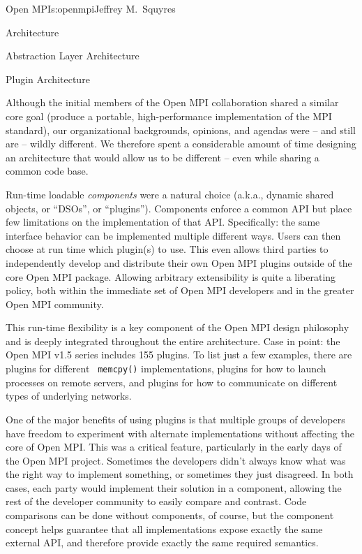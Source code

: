 \begin{aosachapter}{Open MPI}{s:openmpi}{Jeffrey M.\ Squyres}
\begin{aosasect1}{Architecture}
\begin{aosasect2}{Abstraction Layer Architecture}
\end{aosasect2}


\begin{aosasect2}{Plugin Architecture}


Although the initial members of the Open MPI collaboration shared a
similar core goal (produce a portable, high-performance
implementation of the MPI standard), our organizational backgrounds,
opinions, and agendas were -- and still are -- wildly different.
%
We therefore spent a considerable amount of time designing an
architecture that would allow us to be different -- even while sharing
a common code base.

Run-time loadable \emph{components} were a natural choice (a.k.a.,
dynamic shared objects, or ``DSOs'', or ``plugins'').  Components
enforce a common API but place few limitations on the implementation
of that API.
%
Specifically: the same interface behavior can be implemented multiple
different ways.
%
Users can then choose at run time which plugin(s) to use.
%
This even allows third parties to independently develop and distribute
their own Open MPI plugins outside of the core Open MPI package.
%
Allowing arbitrary extensibility is quite a liberating policy, both
within the immediate set of Open MPI developers and in the greater
Open MPI community.

This run-time flexibility is a key component of the Open MPI design
philosophy and is deeply integrated throughout the entire
architecture.
%
Case in point: the Open MPI v1.5 series includes 155 plugins.
%
To list just a few examples, there are plugins for different {\tt
  memcpy()} implementations, plugins for how to launch processes on
remote servers, and plugins for how to communicate on different types
of underlying networks.

One of the major benefits of using plugins is that multiple groups of
developers have freedom to experiment with alternate implementations
without affecting the core of Open MPI.
%
This was a critical feature, particularly in the early days of the
Open MPI project.  Sometimes the developers didn't always know what
was the right way to implement something, or sometimes they just
disagreed.
%
In both cases, each party would implement their solution in a
component, allowing the rest of the developer community to easily
compare and contrast. 
%
Code comparisons can be done without components, of course, but the
component concept helps guarantee that all implementations expose
exactly the same external API, and therefore provide exactly the same
required semantics.  


\end{aosasect2}
\end{aosasect1}
\end{aosachapter}

